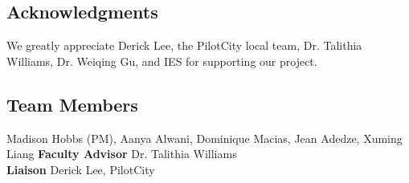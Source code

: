 \documentclass[clinic]{hmcposter}
\begin{document}
\begin{poster}




\section{Acknowledgments}
We greatly appreciate Derick Lee, the PilotCity local team, Dr. Talithia Williams, Dr. Weiqing Gu, and IES for supporting our project.

\subsection{Team Members}
\begin{multicols}{2}
\setlength{\columnseprule}{0pt}
Madison Hobbs (PM), Aanya Alwani, Dominique Macias, Jean Adedze, Xuming Liang
\vfill
\columnbreak
\textbf{Faculty Advisor} Dr. Talithia Williams \\
\textbf{Liaison} Derick Lee, PilotCity
\end{multicols}


\vfill


\end{poster}
\end{document}
